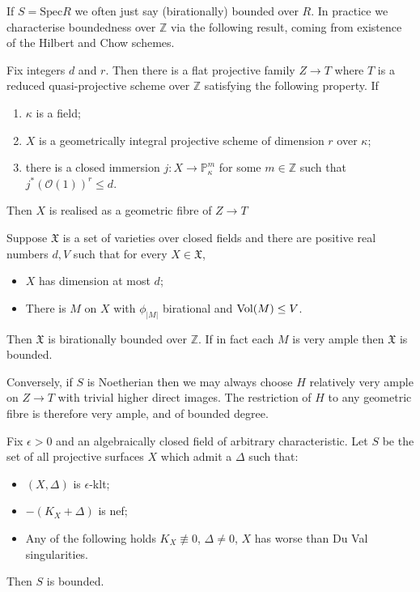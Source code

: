 If $S=\text{Spec}{R}$ we often just say (birationally) bounded over $R$. In practice we characterise boundedness over $\mathbb{Z}$ via the following result, coming from existence of the Hilbert and Chow schemes.

\begin{lemma}\cite[Proposition 5.3]{tanaka2019boundedness}
	Fix integers $d$ and $r$. Then there is a flat projective family $Z \to T$ where $T$ is a reduced quasi-projective scheme over $\mathbb{Z}$ satisfying the following property. If
	\begin{enumerate}
		\item $\kappa$ is a field;
		\item $X$ is a geometrically integral projective scheme of dimension $r$ over $\kappa$;
		\item there is a closed immersion $j\colon X \to \mathbb{P}^{m}_{\kappa}$ for some $m\in \mathbb{Z}$ such that $j^{*}(\mathcal{O}(1))^{r} \leq d$.
	\end{enumerate}
	
	Then $X$ is realised as a geometric fibre of $Z \to T$
\end{lemma}

\begin{corollary}\label{l_birationally-bounded}
	Suppose $\mathfrak{X}$ is a set of varieties over closed fields and there are positive real numbers $d,V$ such that for every $X \in \mathfrak{X}$,
	\begin{itemize}
		\item $X$ has dimension at most $d$;
		\item There is $M$ on $X$ with $\phi_{|M|}$ birational and $\text{Vol}(M)\leq V$.
	\end{itemize}
	Then $\mathfrak{X}$ is birationally bounded over $\mathbb{Z}$. If in fact each $M$ is very ample then $\mathfrak{X}$ is bounded. 
\end{corollary}

Conversely, if $S$ is Noetherian then we may always choose $H$ relatively very ample on $Z \to T$ with trivial higher direct images. The restriction of $H$ to any geometric fibre is therefore very ample, and of bounded degree. 


	\begin{theorem}\cite[Theorem 6.9]{alexeev1994boundedness}\label{BAB}
		Fix $\epsilon >0$ and an algebraically closed field of arbitrary characteristic. Let $S$ be the set of all projective surfaces $X$ which admit a $\Delta$ such that:
		\begin{itemize}
			\item $(X,\Delta)$ is $\epsilon$-klt;
			\item $-(K_{X}+\Delta)$ is nef;
			\item Any of the following holds $K_{X} \not\equiv 0$, $\Delta \neq 0$, $X$ has worse than Du Val singularities.
		\end{itemize}
		Then $S$ is bounded.
	\end{theorem}

